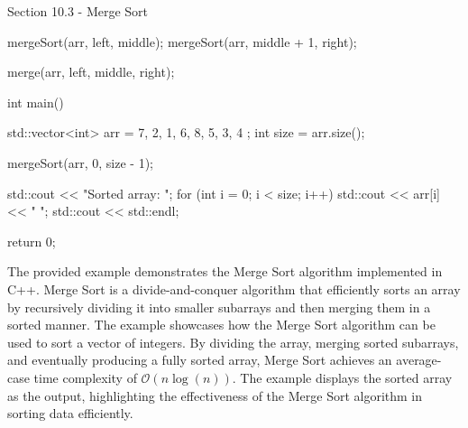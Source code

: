 \begin{notes}{Section 10.3 - Merge Sort}
\begin{highlight}
\begin{code}[C++]
{{            mergeSort(arr, left, middle);
            mergeSort(arr, middle + 1, right);
    
            merge(arr, left, middle, right);
        }
    }
    
    int main() {
        std::vector<int> arr = { 7, 2, 1, 6, 8, 5, 3, 4 };
        int size = arr.size();
    
        mergeSort(arr, 0, size - 1);
    
        std::cout << "Sorted array: ";
        for (int i = 0; i < size; i++) {
            std::cout << arr[i] << " ";
        }
        std::cout << std::endl;
    
        return 0;
    }
    \end{code}
        The provided example demonstrates the Merge Sort algorithm implemented in C++. Merge Sort is a divide-and-conquer algorithm that efficiently sorts an array by recursively dividing it into smaller subarrays and then merging them in a sorted manner. The example showcases how the Merge Sort algorithm can be used to sort a vector of integers. 
        By dividing the array, merging sorted subarrays, and eventually producing a fully sorted array, Merge Sort achieves an average-case time complexity of $\mathcal{O}(n\log{(n)})$. The example displays the sorted array as the output, highlighting the effectiveness of the Merge Sort algorithm in sorting data efficiently.
    \end{highlight}
\end{notes}

